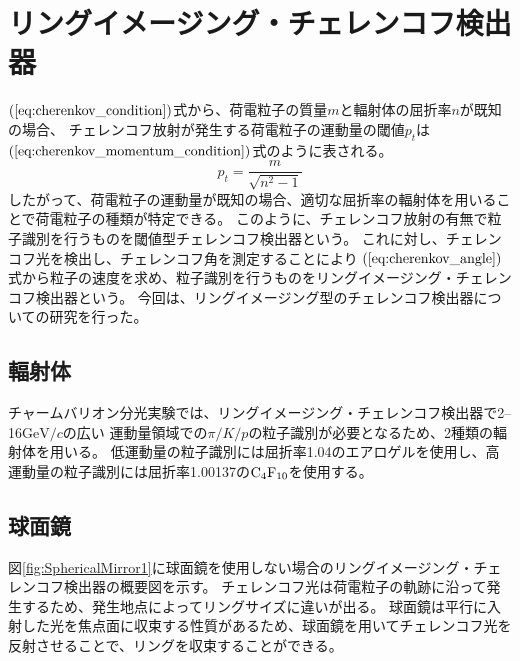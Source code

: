 \section{リングイメージング・チェレンコフ検出器}
$(\ref{eq:cherenkov_condition})$式から、荷電粒子の質量$m$と輻射体の屈折率$n$が既知の場合、
チェレンコフ放射が発生する荷電粒子の運動量の閾値$p_t$は$(\ref{eq:cherenkov_momentum_condition})$式のように表される。
\begin{equation}
  \label{eq:cherenkov_momentum_condition}
  p_t = \frac{m}{\sqrt{n^2-1}}
\end{equation}
したがって、荷電粒子の運動量が既知の場合、適切な屈折率の輻射体を用いることで荷電粒子の種類が特定できる。
このように、チェレンコフ放射の有無で粒子識別を行うものを閾値型チェレンコフ検出器という。
これに対し、チェレンコフ光を検出し、チェレンコフ角を測定することにより
$(\ref{eq:cherenkov_angle})$式から粒子の速度を求め、粒子識別を行うものをリングイメージング・チェレンコフ検出器という。
今回は、リングイメージング型のチェレンコフ検出器についての研究を行った。

\subsection{輻射体}
チャームバリオン分光実験では、リングイメージング・チェレンコフ検出器で2--16\space$\si{\GeV / c}$の広い
運動量領域での$\pi/K/p$の粒子識別が必要となるため、2種類の輻射体を用いる。
低運動量の粒子識別には屈折率1.04のエアロゲルを使用し、高運動量の粒子識別には屈折率1.00137の$\rm{C_{4}F_{10}}$を使用する。


\subsection{球面鏡}
図\ref{fig:SphericalMirror1}に球面鏡を使用しない場合のリングイメージング・チェレンコフ検出器の概要図を示す。
チェレンコフ光は荷電粒子の軌跡に沿って発生するため、発生地点によってリングサイズに違いが出る。
球面鏡は平行に入射した光を焦点面に収束する性質があるため、球面鏡を用いてチェレンコフ光を反射させることで、リングを収束することができる。


